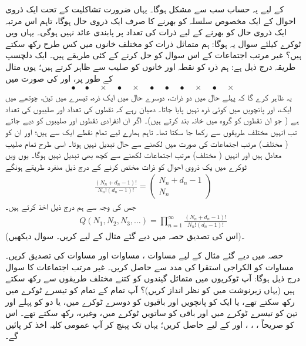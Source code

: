   کے لیے یہ حساب سب سے مشکل ہوگا۔ یہاں ضرورت تشاکلیت کے تحت ایک ذروی احوال کے ایک مخصوص سلسلہ کو بھرنے کا صرف ایک  ذروی حال ہوگا، تاہم اس مرتبہ ایک ذروی حال کو بھرنے کے لیے ذرات کی تعداد پر پابندی عائد نہیں ہوگی۔ یہاں  ویں ٹوکرے کیلئے سوال یہ ہوگا: ہم متماثل  ذرات کو  مختلف خانوں میں کس طرح رکھ سکتے ہیں؟ غیر مرتب اجتماعات کے اس سوال کو حل کرنے کے کئی طریقے ہیں۔ ایک دلچسپ طریقہ درج ذیل ہے: ہم ذرہ کو نقطہ اور خانوں کو صلیب سے ظاہر کرتے ہیں؛ یوں مثال کے طور پر،  اور  کی صورت میں
\begin{align*} 
\bullet \quad \bullet \quad \times \quad \bullet \quad \times \quad \bullet \quad \bullet \quad \bullet \quad \times \quad \bullet \quad \times
\end{align*}
یہ ظاہر کرے گا کہ پہلے حال میں دو ذرات، دوسرے حال میں ایک ذرہ، تیسرے میں تین، چوتھے میں ایک، اور پانچویں میں کوئی ذرہ نہیں پایا جاتا۔ دھیان رہے کہ نقطوں کی تعداد  اور صلیبوں کی تعداد  ہے ( جو ان نقطوں کو  گروہ میں خانہ بند کرتے ہیں)۔ اگر ان انفرادی نقطوں اور صلیبوں کو  دیے جاتے تب انہیں  مختلف طریقوں سے رکھا جا سکتا تھا۔ تاہم ہمارے لیے تمام نقطے ایک سے ہیں؛ اور ان کو ( مختلف) مرتب اجتماعات کی صورت میں لکھنے سے حال تبدیل نہیں ہوتا۔ اسی طرح تمام صلیب معادل ہیں اور انہیں (  مختلف) مرتب اجتماعات لکھنے سے کچھ بھی تبدیل نہیں ہوگا۔ یوں  ویں ٹوکرے میں  یک ذروی احوال کو  ذرات مختص کرنے کے درج ذیل منفرد طریقے ہونگے 
\begin{align}\label{مساوات_متماثل_بوسن_درمیانہ_اجتماعات}
\frac{(N_n + d_n - 1) !}{N_n ! (d_n - 1) !} = 
\begin{pmatrix}
N_n + d_n - 1 \\
N_n
\end{pmatrix}
\end{align}
جس کی وجہ سے ہم درج ذیل اخذ کرتے ہیں۔ 
\begin{align}\label{مساوات_متماثل_بوسن_اجتماعات}
Q(N_1 , N_2 , N_3 , \dotsc) = \prod_{n = 1}^{\infty} \frac{(N_n + d_n - 1) !}{N_n ! (d_n - 1) !}
\end{align}
(اس کی تصدیق حصہ  میں دیے گئے مثال کے لیے کریں۔ سوال  دیکھیں)۔


حصہ  میں دیے گئے مثال کے لیے مساوات ، مساوات  اور مساوات  کی تصدیق کریں۔ 
مساوات  کو الكراجى استقرا کی مدد سے حاصل کریں۔ غیر مرتب اجتماعات کا سوال درج ذیل ہوگا: آپ  ٹوکریوں میں  متماثل گیندوں کو کتنے مختلف طریقوں سے رکھ سکتے ہیں (یہاں زیرنوشت میں  کو نظر انداز کریں)؟ آپ تمام کے تمام  کو تیسرے ٹوکرے میں رکھ سکتے تھے، یا ایک کو پانچویں اور باقیوں کو دوسرے ٹوکرے میں، یا دو کو پہلے اور تین کو تیسرے ٹوکرے میں اور باقی کو ساتویں ٹوکرے میں، وغیرہ، رکھ سکتے تھے۔ اس کو صریحاً ، ، ، اور کے لیے حاصل کریں؛ یہاں تک پہنچ کر آپ عمومی کلیہ اخذ کر پائیں گے۔ 


